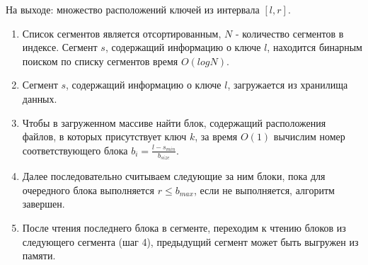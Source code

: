 На выходе: множество расположений ключей из интервала $[l, r]$.
\begin{enumerate}
    \item Список сегментов является отсортированным, $N$ - количество сегментов в индексе. Сегмент $s$, содержащий информацию о ключе $l$, находится бинарным поиском по списку сегментов время $O(logN)$.
    \item Сегмент $s$, содержащий информацию о ключе $l$, загружается из хранилища данных.
    \item Чтобы в загруженном массиве найти блок, содержащий расположения файлов, в которых присутствует ключ $k$, за время $O(1)$ вычислим номер соответствующего блока $b_{i} = \frac{l - s_{min}}{b_{size}}$.
    \item Далее последовательно считываем следующие за ним блоки, пока для очередного блока выполняется $r \leq b_{max}$, если не выполняется, алгоритм завершен.
    \item После чтения последнего блока в сегменте, переходим к чтению блоков из следующего сегмента (шаг 4), предыдущий сегмент может быть выгружен из памяти.
\end{enumerate}

